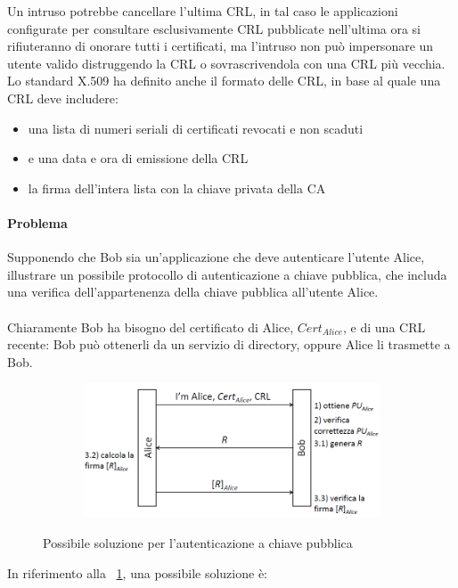 Un intruso potrebbe cancellare l'ultima CRL, in tal caso le applicazioni configurate per consultare esclusivamente CRL pubblicate nell'ultima ora si rifiuteranno di onorare tutti i certificati, ma l'intruso non può impersonare un utente valido distruggendo la CRL o sovrascrivendola con una CRL più vecchia.\\
Lo standard X.509 ha definito anche il formato delle CRL, in base al quale una CRL deve includere:
\begin{itemize}
	\item una lista di numeri seriali di certificati revocati e non scaduti
	\item e una data e ora di emissione della CRL
	\item la firma dell'intera lista con la chiave privata della CA
\end{itemize}
\paragraph{Problema}
Supponendo che Bob sia un'applicazione che deve autenticare l'utente Alice, illustrare un possibile protocollo di autenticazione a chiave pubblica, che includa una verifica dell'appartenenza della chiave pubblica all'utente Alice.
\\ \\
Chiaramente Bob ha bisogno del certificato di Alice, \textit{$Cert_{Alice}$}, e di una CRL recente: Bob può ottenerli da un servizio di directory, oppure Alice li trasmette a Bob. 
\begin{figure}[htbp]
	\centering%
	\subfigure%
	{\includegraphics[height=4cm, width=12cm, keepaspectratio]{Immagini/autenticazione/ImgS76.png}}
	\caption{Possibile soluzione per l'autenticazione a chiave pubblica\label{fig:ImgS76}} 	
\end{figure}
In riferimento alla \figurename~\ref{fig:ImgS76}, una possibile soluzione è:
